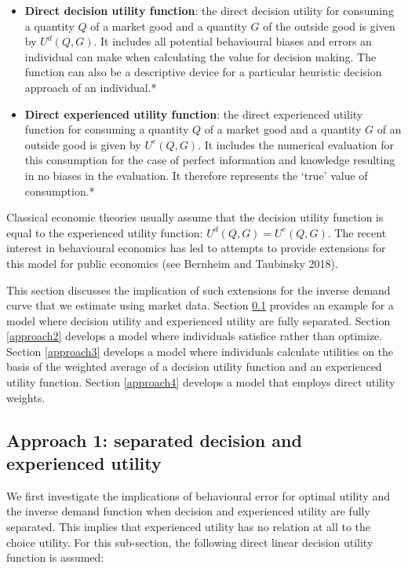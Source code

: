 \documentclass[
]{book}
\begin{document}
\begin{itemize}
\item
  \textbf{Direct decision utility function}: the direct decision utility for consuming a quantity \(Q\) of a market good and a quantity \(G\) of the outside good is given by \(U^d (Q,G)\). It includes all potential behavioural biases and errors an individual can make when calculating the value for decision making. The function can also be a descriptive device for a particular heuristic decision approach of an individual.*
\item
  \textbf{Direct experienced utility function}: the direct experienced utility function for consuming a quantity \(Q\) of a market good and a quantity \(G\) of an outside good is given by \(U^e (Q,G)\). It includes the numerical evaluation for this consumption for the case of perfect information and knowledge resulting in no biases in the evaluation. It therefore represents the `true' value of consumption.*
\end{itemize}

Classical economic theories usually assume that the decision utility function is equal to the experienced utility function: \(U^d (Q,G)=U^e (Q,G)\). The recent interest in behavioural economics has led to attempts to provide extensions for this model for public economics (see Bernheim and Taubinsky 2018).

This section discusses the implication of such extensions for the inverse demand curve that we estimate using market data. Section \ref{approach1} provides an example for a model where decision utility and experienced utility are fully separated. Section \ref{approach2} develops a model where individuals satisfice rather than optimize. Section \ref{approach3} develops a model where individuals calculate utilities on the basis of the weighted average of a decision utility function and an experienced utility function. Section \ref{approach4} develops a model that employs direct utility weights.

\hypertarget{approach1}{%
\subsection{Approach 1: separated decision and experienced utility}\label{approach1}}

We first investigate the implications of behavioural error for optimal utility and the inverse demand function when decision and experienced utility are fully separated. This implies that experienced utility has no relation at all to the choice utility. For this sub-section, the following direct linear decision utility function is assumed:
\end{document}

